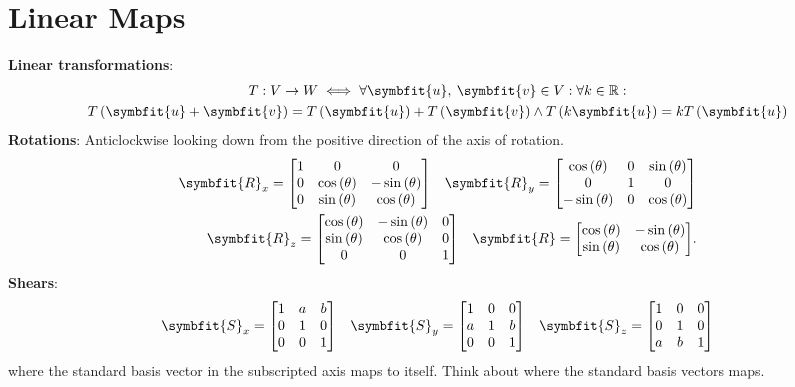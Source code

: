 \documentclass{article}
\begin{document}
\begin{minipage}[t]{126.1962963mm}
    \section*{Linear Maps}
    \textbf{Linear transformations}:
    \begin{gather*}
        T:V\rightarrow W \iff \forall \symbfit{u},\: \symbfit{v} \in V:\forall k \in \mathbb{R}: \\
        T\left(\symbfit{u}+\symbfit{v}\right) = T\left(\symbfit{u}\right) + T\left(\symbfit{v}\right) \wedge T\left(k\symbfit{u}\right) = kT\left(\symbfit{u}\right)
    \end{gather*}
    \textbf{Rotations}: Anticlockwise looking down from the positive direction of the
    axis of rotation.
    \begin{align*}
        \symbfit{R}_x = \mqty[1                           & 0                            & 0 \\ 0 & \cos{\left( \theta \right)} & -\sin{\left( \theta \right)} \\ 0 & \sin{\left( \theta \right)} & \cos{\left( \theta \right)}] \quad \symbfit{R}_y = \mqty[\cos{\left( \theta \right)} & 0                            & \sin{\left( \theta \right)} \\ 0 & 1 & 0 \\ -\sin{\left( \theta \right)} & 0 & \cos{\left( \theta \right)}] \\
        \symbfit{R}_z = \mqty[\cos{\left( \theta \right)} & -\sin{\left( \theta \right)} & 0 \\ \sin{\left( \theta \right)} & \cos{\left( \theta \right)} & 0 \\ 0 & 0 & 1] \quad \symbfit{R} = \mqty[\cos{\left( \theta \right)} & -\sin{\left( \theta \right)} \\ \sin{\left( \theta \right)} & \cos{\left( \theta \right)}].
    \end{align*}
    \textbf{Shears}:
    \begin{align*}
        \symbfit{S}_x = \mqty[1 & a & b \\ 0 & 1 & 0 \\ 0 & 0 & 1] \quad
        \symbfit{S}_y=\mqty[1   & 0 & 0 \\ a & 1 & b \\ 0 & 0 & 1] \quad
        \symbfit{S}_z=\mqty[1   & 0 & 0 \\ 0 & 1 & 0 \\ a & b & 1]
    \end{align*}
    where the standard basis vector in the subscripted axis maps to itself.
    Think about where the standard basis vectors maps.


\end{minipage}
\end{document}
